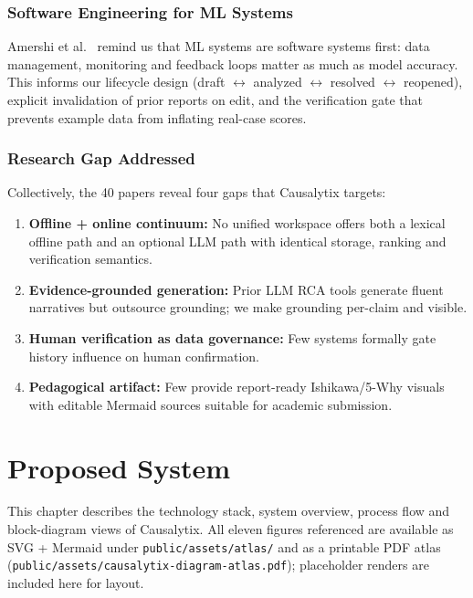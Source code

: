 \documentclass[12pt,a4paper,oneside]{report}
\begin{document}
\subsection{Software Engineering for ML Systems}
Amershi et al.\ \cite{amershi2019software} remind us that ML systems are software systems first: data management, monitoring and feedback loops matter as much as model accuracy. This informs our lifecycle design (draft $\leftrightarrow$ analyzed $\leftrightarrow$ resolved $\leftrightarrow$ reopened), explicit invalidation of prior reports on edit, and the verification gate that prevents example data from inflating real-case scores.

\subsection{Research Gap Addressed}
Collectively, the 40 papers reveal four gaps that Causalytix targets:

\begin{enumerate}
\item \textbf{Offline + online continuum:} No unified workspace offers both a lexical offline path and an optional LLM path with identical storage, ranking and verification semantics.
\item \textbf{Evidence-grounded generation:} Prior LLM RCA tools generate fluent narratives but outsource grounding; we make grounding per-claim and visible.
\item \textbf{Human verification as data governance:} Few systems formally gate history influence on human confirmation.
\item \textbf{Pedagogical artifact:} Few provide report-ready Ishikawa/5-Why visuals with editable Mermaid sources suitable for academic submission.
\end{enumerate}

\chapter{Proposed System}
\label{ch:proposed}

This chapter describes the technology stack, system overview, process flow and block-diagram views of Causalytix. All eleven figures referenced are available as SVG + Mermaid under \texttt{public/assets/atlas/} and as a printable PDF atlas (\texttt{public/assets/causalytix-diagram-atlas.pdf}); placeholder renders are included here for layout.
\end{document}
